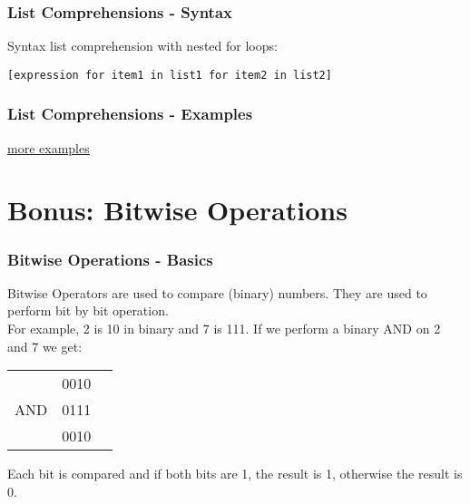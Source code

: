 \documentclass{beamer}
\newcommand{\hrefu}[2]{\underline{\href{#1}{#2}}}
\begin{document}
\begin{frame}
  \frametitle{List Comprehensions - Syntax}
  Syntax list comprehension with nested for loops: \\
  \begin{center}
    \vspace{5mm}
    \texttt{[expression for item1 in list1 for item2 in list2]} \\
    
  \end{center}
\end{frame}
\begin{frame}
  \frametitle{List Comprehensions - Examples}
  
  \small\hrefu{https://www.learnbyexample.org/python-list-comprehension/}{more examples}
\end{frame}

\section{Bonus: Bitwise Operations}
\begin{frame}
  \frametitle{Bitwise Operations - Basics}
  Bitwise Operators are used to compare (binary) numbers. They are used to perform bit by bit operation. \\For example, 2 is 10 in binary and 7 is 111. If we perform a binary AND on 2 and 7 we get:
  \begin{table}
    \centering
    \begin{tabular}{c|c|c}
       &0010 \\
    AND&0111 \\
    \hline
       &0010\\
    \end{tabular}
  \end{table}
  Each bit is compared and if both bits are 1, the result is 1, otherwise the result is 0.\\
\end{frame}
\end{document}
